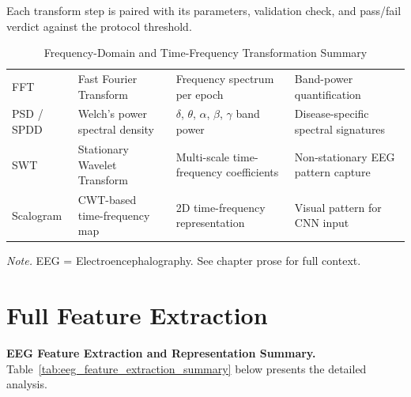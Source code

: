 {\tablestripes\tablefontsize

\noindent Each transform step is paired with its parameters, validation check, and pass/fail verdict against the protocol threshold.

\begin{xltabular}{\textwidth}{@{} l L L L @{}}
\caption[Frequency-Domain and Time-Frequency Transformation Summary]{Frequency-Domain and Time-Frequency Transformation Summary}\label{tab:freq_transform_summary} \\
\toprule
{} &  &  &  \\
\midrule
\endfirsthead
\endhead
\bottomrule
\endlastfoot
FFT & Fast Fourier Transform & Frequency spectrum per epoch & Band-power quantification \\
PSD / SPDD & Welch's power spectral density & $\delta$, $\theta$, $\alpha$, $\beta$, $\gamma$ band power & Disease-specific spectral signatures \\
SWT & Stationary Wavelet Transform & Multi-scale time-frequency coefficients & Non-stationary EEG pattern capture \\
Scalogram & CWT-based time-frequency map & 2D time-frequency representation & Visual pattern for CNN input \\
\end{xltabular}}
\vspace{0.3em}\noindent\textit{Note.} EEG = Electroencephalography. See chapter prose for full context.


\section{Full Feature Extraction}
\label{sec:appendix_ch4_tab_eeg_feature_extraction_summary}


\noindent\textbf{EEG Feature Extraction and Representation Summary.} Table~\ref{tab:eeg_feature_extraction_summary} below presents the detailed analysis.

